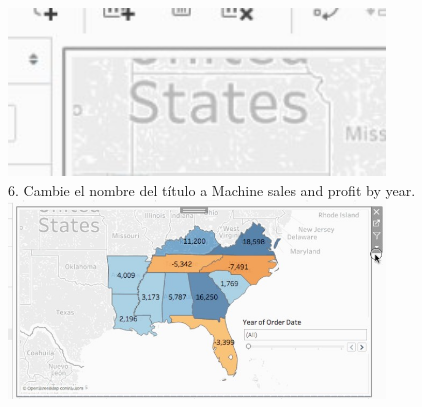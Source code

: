 \documentclass[preprint,12pt]{elsarticle}
\begin{document}
\begin{itemize}
					\\	\includegraphics[width=10cm]{./IMAGENES/7.1.3}
				\\ 6. Cambie el nombre del título a Machine sales and profit by year.
					\\	\includegraphics[width=10cm]{./IMAGENES/7.1.4}
			\end{itemize}
		
\end{document}
